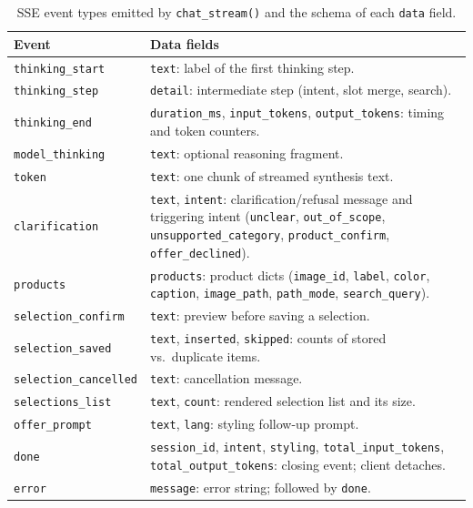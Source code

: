 \begin{table}[H]
\centering
\caption{SSE event types emitted by \texttt{chat\_stream()} and the schema of each \texttt{data} field.}
\label{tab:impl_sse}
\small
\begin{tabular}{p{3.2cm} p{8.4cm}}
\toprule
\textbf{Event} & \textbf{Data fields} \\
\midrule
\texttt{thinking\_start} & \texttt{text}: label of the first thinking step. \\
\texttt{thinking\_step} & \texttt{detail}: intermediate step (intent, slot merge, search). \\
\texttt{thinking\_end} & \texttt{duration\_ms}, \texttt{input\_tokens}, \texttt{output\_tokens}: timing and token counters. \\
\texttt{model\_thinking} & \texttt{text}: optional reasoning fragment. \\
\texttt{token} & \texttt{text}: one chunk of streamed synthesis text. \\
\texttt{clarification} & \texttt{text}, \texttt{intent}: clarification/refusal message and triggering intent (\texttt{unclear}, \texttt{out\_of\_scope}, \texttt{unsupported\_category}, \texttt{product\_confirm}, \texttt{offer\_declined}). \\
\texttt{products} & \texttt{products}: product dicts (\texttt{image\_id}, \texttt{label}, \texttt{color}, \texttt{caption}, \texttt{image\_path}, \texttt{path\_mode}, \texttt{search\_query}). \\
\texttt{selection\_confirm} & \texttt{text}: preview before saving a selection. \\
\texttt{selection\_saved} & \texttt{text}, \texttt{inserted}, \texttt{skipped}: counts of stored vs.\ duplicate items. \\
\texttt{selection\_cancelled} & \texttt{text}: cancellation message. \\
\texttt{selections\_list} & \texttt{text}, \texttt{count}: rendered selection list and its size. \\
\texttt{offer\_prompt} & \texttt{text}, \texttt{lang}: styling follow-up prompt. \\
\texttt{done} & \texttt{session\_id}, \texttt{intent}, \texttt{styling}, \texttt{total\_input\_tokens}, \texttt{total\_output\_tokens}: closing event; client detaches. \\
\texttt{error} & \texttt{message}: error string; followed by \texttt{done}. \\
\bottomrule
\end{tabular}
\end{table}

